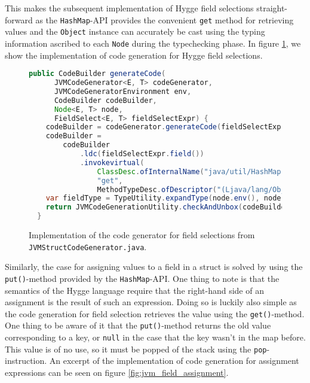 This makes the subsequent implementation of Hygge field selections straight-forward as the \texttt{HashMap}-API
provides the convenient \texttt{get} method for retrieving values and the \texttt{Object} instance can accurately be
cast using the typing information ascribed to each \texttt{Node} during the typechecking phase.
In figure \ref{fig:jvm_constructor_builder}, we show the implementation of code generation for Hygge field selections.

\begin{figure}
    \centering
    \begin{lstlisting}[language=Java]
  public CodeBuilder generateCode(
      JVMCodeGenerator<E, T> codeGenerator,
      JVMCodeGeneratorEnvironment env,
      CodeBuilder codeBuilder,
      Node<E, T> node,
      FieldSelect<E, T> fieldSelectExpr) {
    codeBuilder = codeGenerator.generateCode(fieldSelectExpr.target(), env, codeBuilder);
    codeBuilder =
        codeBuilder
            .ldc(fieldSelectExpr.field())
            .invokevirtual(
                ClassDesc.ofInternalName("java/util/HashMap"),
                "get",
                MethodTypeDesc.ofDescriptor("(Ljava/lang/Object;)Ljava/lang/Object;"));
    var fieldType = TypeUtility.expandType(node.env(), node.type());
    return JVMCodeGenerationUtility.checkAndUnbox(codeBuilder, fieldType);
  }
    \end{lstlisting}
    \caption{Implementation of the code generator for field selections from \texttt{JVMStructCodeGenerator.java}.}
    \label{fig:jvm_constructor_builder}
\end{figure}

Similarly, the case for assigning values to a field in a struct is solved by using the \texttt{put()}-method provided
by the \texttt{HashMap}-API\cite{hashmap}. One thing to note is that the semantics of the Hygge language require that the right-hand side
of an assignment is the result of such an expression. Doing so is luckily also simple as the code generation for field selection
retrieves the value using the \texttt{get()}-method. One thing to be aware of it that the \texttt{put()}-method returns
the old value corresponding to a key, or \texttt{null} in the case that the key wasn't in the map before. This value
is of no use, so it must be popped of the stack using the \texttt{pop}-instruction\cite{jvm_spec}. An excerpt of the implementation
of code generation for assignment expressions can be seen on figure \ref{fig:jvm_field_assignment}.

